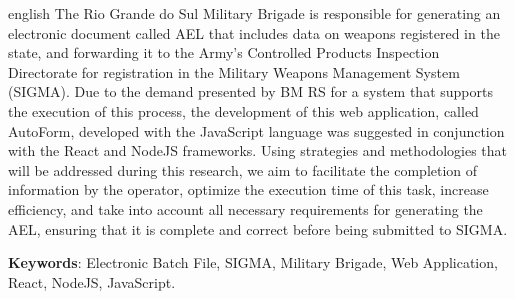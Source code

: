 \begin{resumo}[Abstract]
 \begin{otherlanguage*}{english}
  The Rio Grande do Sul Military Brigade is responsible for generating an electronic document called AEL that includes data on weapons registered in the state, and forwarding it to the Army's Controlled Products Inspection Directorate for registration in the Military Weapons Management System (SIGMA). Due to the demand presented
by BM RS for a system that supports the execution of this process, the development of this web application, called AutoForm, developed with the JavaScript language was suggested
in conjunction with the React and NodeJS frameworks. Using strategies and methodologies
that will be addressed during this research, we aim to facilitate the completion of information by the
operator, optimize the execution time of this task, increase efficiency, and take into account all
necessary requirements for generating the AEL, ensuring that it is complete and correct before
being submitted to SIGMA.

   \vspace{\onelineskip}
 
   \noindent 
   \textbf{Keywords}: Electronic Batch File, SIGMA, Military Brigade, Web Application, React, NodeJS, JavaScript.%
 \end{otherlanguage*}
\end{resumo}